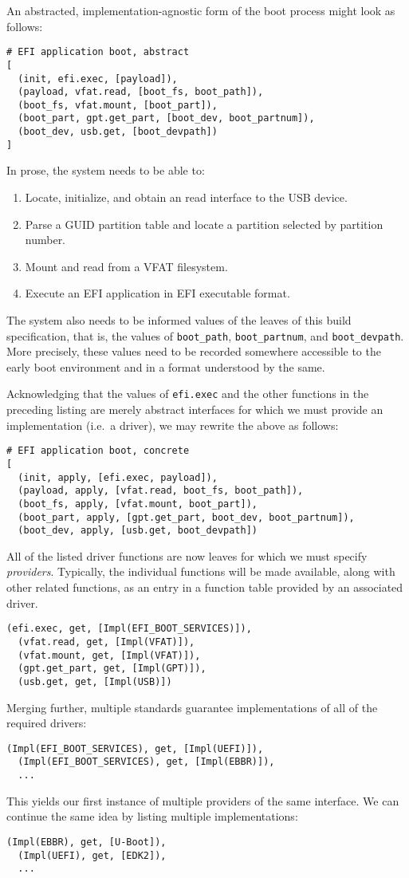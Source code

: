 An abstracted, implementation-agnostic form of the boot process might look as follows:
%
\begin{lstlisting}
# EFI application boot, abstract
[
  (init, efi.exec, [payload]),
  (payload, vfat.read, [boot_fs, boot_path]),
  (boot_fs, vfat.mount, [boot_part]),
  (boot_part, gpt.get_part, [boot_dev, boot_partnum]),
  (boot_dev, usb.get, [boot_devpath])
]
\end{lstlisting}
%
In prose, the system needs to be able to:
\begin{enumerate}
  \item Locate, initialize, and obtain an read interface to the USB device.
  \item Parse a GUID partition table and locate a partition selected by partition number.
  \item Mount and read from a VFAT filesystem.
  \item Execute an EFI application in EFI executable format.
\end{enumerate}
%
The system also needs to be informed values of the leaves of this build specification, that is, the values of \texttt{boot\_path}, \texttt{boot\_partnum}, and \texttt{boot\_devpath}.
%
More precisely, these values need to be recorded somewhere accessible to the early boot environment and in a format understood by the same.

Acknowledging that the values of \texttt{efi.exec} and the other functions in the preceding listing are merely abstract interfaces for which we must provide an implementation (i.e.~a driver), we may rewrite the above as follows:
%
\begin{lstlisting}[name=efi]
# EFI application boot, concrete
[
  (init, apply, [efi.exec, payload]),
  (payload, apply, [vfat.read, boot_fs, boot_path]),
  (boot_fs, apply, [vfat.mount, boot_part]),
  (boot_part, apply, [gpt.get_part, boot_dev, boot_partnum]),
  (boot_dev, apply, [usb.get, boot_devpath])
\end{lstlisting}
%
All of the listed driver functions are now leaves for which we must specify \emph{providers}.
%
Typically, the individual functions will be made available, along with other related functions, as an entry in a function table provided by an associated driver.
%
\begin{lstlisting}[name=efi]
  (efi.exec, get, [Impl(EFI_BOOT_SERVICES)]),
  (vfat.read, get, [Impl(VFAT)]),
  (vfat.mount, get, [Impl(VFAT)]),
  (gpt.get_part, get, [Impl(GPT)]),
  (usb.get, get, [Impl(USB)])
\end{lstlisting}
%
Merging further, multiple standards guarantee implementations of all of the required drivers:
%
\begin{lstlisting}[name=efi]
  (Impl(EFI_BOOT_SERVICES), get, [Impl(UEFI)]),
  (Impl(EFI_BOOT_SERVICES), get, [Impl(EBBR)]),
  ...
\end{lstlisting}
%
This yields our first instance of multiple providers of the same interface.
%
We can continue the same idea by listing multiple implementations:
%
\begin{lstlisting}[firstnumber=22]
  (Impl(EBBR), get, [U-Boot]),
  (Impl(UEFI), get, [EDK2]),
  ...
\end{lstlisting}

